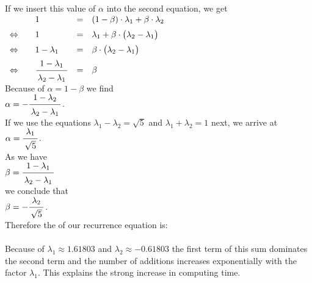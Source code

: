 If we insert this value of $\alpha$  into the second equation, we get 
\\[0.2cm]
\hspace*{1.3cm}
$
\begin{array}{clcl}
                      &  1 & = & (1 - \beta)\cdot  \lambda_1 + \beta \cdot \lambda_2 \\[0.2cm]
\Leftrightarrow\quad  &  1 & = & 
 \lambda_1  + \beta \cdot \bigl( \lambda_2 - \lambda_1\bigr) \\[0.2cm]
\Leftrightarrow\quad  &  1 - \lambda_1 & = & \beta \cdot \bigl(\lambda_2 - \lambda_1\bigr)  \\[0.2cm]
\Leftrightarrow\quad  &  \bruch{1 - \lambda_1}{\lambda_2 - \lambda_1} & = & \beta 
\end{array}
$
\\[0.2cm]
Because of $\alpha = 1 - \beta$ we find  \\[0.2cm]
\hspace*{1.3cm} $\alpha = - \bruch{1 - \lambda_2}{\lambda_2 - \lambda_1}$. \\[0.2cm]
If we use the equations $\lambda_1 - \lambda_2 = \sqrt{5}$ and $\lambda_1 + \lambda_2 = 1$ next, we arrive at
\\[0.2cm]
\hspace*{1.3cm} 
$\alpha = \bruch{\lambda_1}{\sqrt{5}} $.
\\[0.2cm]
As we have
\\[0.2cm]
\hspace*{1.3cm}
$\beta =  \bruch{1 - \lambda_1}{\lambda_2 - \lambda_1}$
\\[0.2cm]
we conclude that
\\[0.2cm]
\hspace*{1.3cm}
$\beta = -\bruch{\lambda_2}{\sqrt{5}}$. 
\\[0.2cm]
Therefore the  of our recurrence equation is: \\[0.2cm]
\hspace*{1.3cm}
  \colorbox{red}{}
\\[0.2cm]
Because of $\lambda_1\approx 1.61803$ and $\lambda_2 \approx - 0.61803$ the first term
of this sum dominates the second term and the number of additions increases exponentially with the factor $\lambda_1$.
This explains the strong increase in computing time.
\vspace*{0.1cm}

